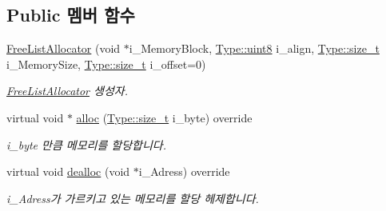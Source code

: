 \subsection*{Public 멤버 함수}
\begin{DoxyCompactItemize}
\item 
\hyperlink{class_comet_engine_1_1_core_1_1_memory_1_1_free_list_allocator_ae13641cb77ff097ec23c1a6112b2e6c6}{Free\+List\+Allocator} (void $\ast$i\+\_\+\+Memory\+Block, \hyperlink{namespace_comet_engine_1_1_type_a1b09856a6463f2bcc4bd8ff0e4e3ee0f}{Type\+::uint8} i\+\_\+align, \hyperlink{namespace_comet_engine_1_1_type_a7c94ea6f8948649f8d181ae55911eeaf}{Type\+::size\+\_\+t} i\+\_\+\+Memory\+Size, \hyperlink{namespace_comet_engine_1_1_type_a7c94ea6f8948649f8d181ae55911eeaf}{Type\+::size\+\_\+t} i\+\_\+offset=0)
\begin{DoxyCompactList}\small\item\em \hyperlink{class_comet_engine_1_1_core_1_1_memory_1_1_free_list_allocator}{Free\+List\+Allocator} 생성자. \end{DoxyCompactList}\item 
virtual void $\ast$ \hyperlink{class_comet_engine_1_1_core_1_1_memory_1_1_free_list_allocator_a73ff0a374ba86a2c447aaf05ad04e932}{alloc} (\hyperlink{namespace_comet_engine_1_1_type_a7c94ea6f8948649f8d181ae55911eeaf}{Type\+::size\+\_\+t} i\+\_\+byte) override
\begin{DoxyCompactList}\small\item\em i\+\_\+byte 만큼 메모리를 할당합니다. \end{DoxyCompactList}\item 
virtual void \hyperlink{class_comet_engine_1_1_core_1_1_memory_1_1_free_list_allocator_ab7a97e4b1500c7ef2c2edc3bec28a84f}{dealloc} (void $\ast$i\+\_\+\+Adress) override
\begin{DoxyCompactList}\small\item\em i\+\_\+\+Adress가 가르키고 있는 메모리를 할당 헤제합니다. \end{DoxyCompactList}\end{DoxyCompactItemize}
